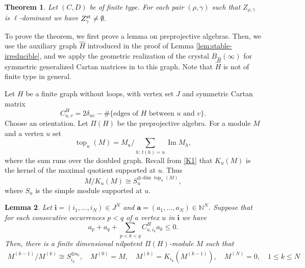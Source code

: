 \documentclass[11pt,reqno]{amsart}
\newtheorem{Theorem}{Theorem}[section]
\newtheorem{Lemma}[Theorem]{Lemma}
\theoremstyle{definition}
\theoremstyle{remark}
\begin{document}
\begin{Theorem}\label{thm:ns-existence}\label{conj:E}
Let $(C,D)$ be of finite type.
For each pair $(\rho,\gamma)$ such that $Z_{\rho,\gamma}$ is $\ell$-dominant  we have
$Z^{\rm st}_\gamma\neq\emptyset.$
\end{Theorem}

To prove the theorem, we first prove a lemma on  preprojective algebras.
Then, we use the auxiliary  graph $\widehat H$ introduced in the proof of Lemma \ref{lem:stable-irreducible}, and
we apply the  geometric realization of the crystal $B_{\widehat H}(\infty)$
for symmetric generalized Cartan matrices in \cite{KS97} to this graph.
Note that $\widehat H$ is not of finite type in general.

Let $H$ be a finite graph without loops, with vertex set $J$ and symmetric
Cartan matrix
\[
C_{u,v}^H=2\delta_{uv}-\#\{\text{edges of $H$ between $u$ and $v$}\}.
\]
Choose an orientation. Let $\Pi(H)$ be the preprojective algebra. 
For a module $M$ and a vertex $u$ set
\[
\operatorname{top}_u(M)
=M_u\Big/\sum_{h:\,t(h)=u}\operatorname{Im}M_h,
\]
where the sum runs over the doubled graph. Recall from \eqref{K1}
that $K_u(M)$ is the kernel of the maximal quotient supported at $u$.
Thus
\[
M/K_u(M)\cong S_u^{\oplus\dim\operatorname{top}_u(M)},
\]
where $S_u$ is the simple module supported at $u$.

\begin{Lemma}\label{lem:ns-finite-word}
Let $\mathbf i=(i_1,\ldots,i_N)\in J^N$ and
$\mathbf a=(a_1,\ldots,a_N)\in\mathbb N^N$.
Suppose that for each consecutive occurrences $p<q$ of a vertex $u$ in $\mathbf i$ we have
\begin{equation}\label{eq:ns-word-inequality}
a_p+a_q+\sum_{p<k<q}C_{u,i_k}^Ha_k\leqslant0.
\end{equation}
Then, there is a finite dimensional nilpotent $\Pi(H)$-module $M$ such that
\begin{align}\label{eq:ns-word-filtration}
M^{(k-1)}/M^{(k)}\cong S_{i_k}^{\oplus a_k}
,\quad
M^{(0)}=M
,\quad 
M^{(k)}=K_{i_k}(M^{(k-1)})
,\quad 
M^{(N)}=0
,\quad
1\leqslant k\leqslant N\end{align}
\end{Lemma}
\end{document}
